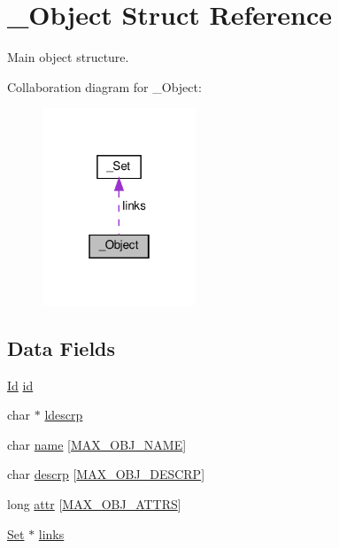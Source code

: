 \hypertarget{struct__Object}{}\section{\+\_\+\+Object Struct Reference}
\label{struct__Object}


Main object structure.  




Collaboration diagram for \+\_\+\+Object\+:\nopagebreak
\begin{figure}[H]
\begin{center}
\leavevmode
\includegraphics[width=130pt]{struct__Object__coll__graph}
\end{center}
\end{figure}
\subsection*{Data Fields}
\begin{DoxyCompactItemize}
\item 
\hyperlink{types_8h_a845e604fb28f7e3d97549da3448149d3}{Id} \hyperlink{struct__Object_a3cff7a0e8dc4e9d23895ed9af1b7653a}{id}
\item 
char $\ast$ \hyperlink{struct__Object_ab2d033c018fbe2639c88561e55306832}{ldescrp}
\item 
char \hyperlink{struct__Object_a59556463a256cec309077768589f10a8}{name} \mbox{[}\hyperlink{object_8h_a6a2f391825e94d06a3137b75abfa1bba}{M\+A\+X\+\_\+\+O\+B\+J\+\_\+\+N\+A\+ME}\mbox{]}
\item 
char \hyperlink{struct__Object_affa493ad8fdeafe924950f7388356a55}{descrp} \mbox{[}\hyperlink{object_8h_a9c396da2f3b9f0191120ff1666af6381}{M\+A\+X\+\_\+\+O\+B\+J\+\_\+\+D\+E\+S\+C\+RP}\mbox{]}
\item 
long \hyperlink{struct__Object_a9074217e572100d1259487a818bb0a0a}{attr} \mbox{[}\hyperlink{object_8h_a6b252b064231d7dc71c194dfea24b32b}{M\+A\+X\+\_\+\+O\+B\+J\+\_\+\+A\+T\+T\+RS}\mbox{]}
\item 
\hyperlink{set_8h_a6d3b7f7c92cbb4577ef3ef7ddbf93161}{Set} $\ast$ \hyperlink{struct__Object_afd29bc78dd0fc104db1aab87c6fc7d5c}{links}
\end{DoxyCompactItemize}


